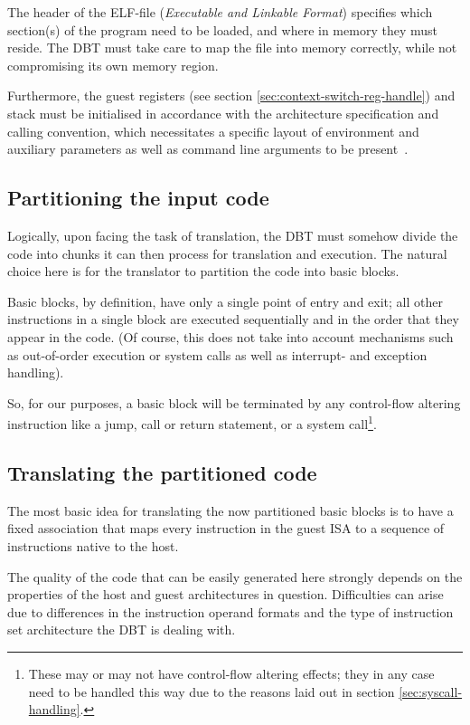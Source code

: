 The header of the ELF-file (\textit{Executable and Linkable Format}) specifies which section(s) of the program need to be loaded, and where in memory they must reside.
The DBT must take care to map the file into memory correctly, while not compromising its own memory region.

Furthermore, the guest registers (see section \vref{sec:context-switch-reg-handle}) and stack must be initialised in accordance with the architecture specification and calling convention, which necessitates a specific layout of environment and auxiliary parameters as well as command line arguments to be present~\cite[S. 2]{bintrans}.


\subsection{Partitioning the input code}
Logically, upon facing the task of translation, the DBT must somehow divide the code into chunks it can then process for translation and execution.
The natural choice here is for the translator to partition the code into basic blocks.

Basic blocks, by definition, have only a single point of entry and exit; all other instructions in a single block are executed sequentially and in the order that they appear in the code.
(Of course, this does not take into account mechanisms such as out-of-order execution or system calls as well as interrupt- and exception handling).

So, for our purposes, a basic block will be terminated by any control-flow altering instruction like a jump, call or return statement, or a system call\footnote{These may or may not have control-flow altering effects; they in any case need to be handled this way due to the reasons laid out in section \vref{sec:syscall-handling}.}.



\subsection{Translating the partitioned code}
The most basic idea for translating the now partitioned basic blocks is to have a fixed association that maps every instruction in the guest ISA to a sequence of instructions native to the host.

The quality of the code that can be easily generated here strongly depends on the properties of the host and guest architectures in question.
Difficulties can arise due to differences in the instruction operand formats and the type of instruction set architecture the DBT is dealing with.

